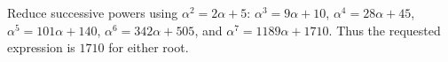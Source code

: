 Reduce successive powers using $\alpha^2=2\alpha+5$: $\alpha^3=9\alpha+10$, $\alpha^4=28\alpha+45$, $\alpha^5=101\alpha+140$, $\alpha^6=342\alpha+505$, and $\alpha^7=1189\alpha+1710$. Thus the requested expression is $\boxed{1710}$ for either root.
